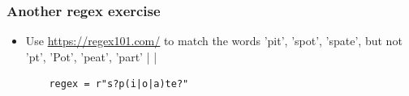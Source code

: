 \documentclass[xcolor=table]{beamer}
\begin{document}
\begin{frame}[fragile]
    \frametitle{Another regex exercise}
    \begin{itemize}
        \item Use \url{https://regex101.com/} to match the words 'pit', 'spot', 'spate', but not 'pt', 'Pot', 'peat', 'part' | \pause |
\begin{lstlisting} 
    regex = r"s?p(i|o|a)te?"
\end{lstlisting} 
    \end{itemize}
\end{frame}

\end{document}
